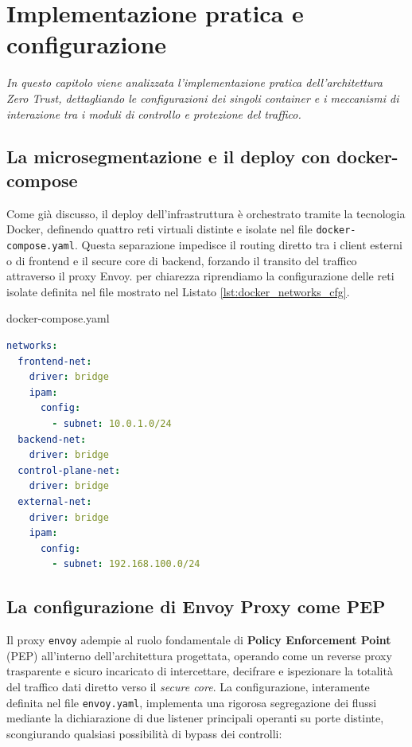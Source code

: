 \section{Implementazione pratica e configurazione}
\label{sec:implementazione}
\thispagestyle{plain}

{\itshape In questo capitolo viene analizzata l'implementazione pratica dell'architettura Zero Trust, dettagliando le configurazioni dei singoli container e i meccanismi di interazione tra i moduli di controllo e protezione del traffico.}

\subsection{La microsegmentazione e il deploy con docker-compose}
Come già discusso, il deploy dell'infrastruttura è orchestrato tramite la tecnologia Docker, definendo quattro reti virtuali distinte e isolate nel file \texttt{docker-compose.yaml}. Questa separazione impedisce il routing diretto tra i client esterni o di frontend e il secure core di backend, forzando il transito del traffico attraverso il proxy Envoy. per chiarezza riprendiamo la configurazione delle reti isolate definita nel file mostrato nel Listato \ref{lst:docker_networks_cfg}.

\begin{center}
\begin{minipage}{\linewidth}
\begin{ztacodebox}{docker-compose.yaml}
\begin{lstlisting}[language=YAML]
networks:
  frontend-net:
    driver: bridge
    ipam:
      config:
        - subnet: 10.0.1.0/24
  backend-net:
    driver: bridge
  control-plane-net:
    driver: bridge
  external-net:
    driver: bridge
    ipam:
      config:
        - subnet: 192.168.100.0/24
\end{lstlisting}
\end{ztacodebox}
\label{lst:docker_networks_cfg}
\end{minipage}
\end{center}

\subsection{La configurazione di Envoy Proxy come PEP}
Il proxy \texttt{envoy} adempie al ruolo fondamentale di \textbf{Policy Enforcement Point} (PEP) all'interno dell'architettura progettata, operando come un reverse proxy trasparente e sicuro incaricato di intercettare, decifrare e ispezionare la totalità del traffico dati diretto verso il \textit{secure core}. La configurazione, interamente definita nel file \texttt{envoy.yaml}, implementa una rigorosa segregazione dei flussi mediante la dichiarazione di due listener principali operanti su porte distinte, scongiurando qualsiasi possibilità di bypass dei controlli:


